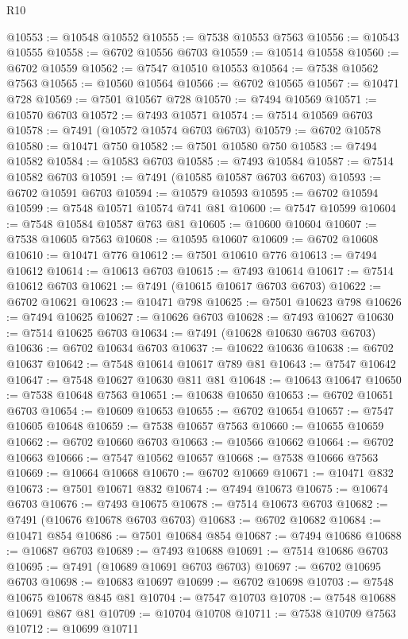 \begin{lexlean}{R10}
\begin{coremodule}
@10553 := @10548 @10552
@10555 := @7538 @10553 @7563
@10556 := @10543 @10555
@10558 := @6702 @10556 @6703
@10559 := @10514 @10558
@10560 := @6702 @10559
@10562 := @7547 @10510 @10553
@10564 := @7538 @10562 @7563
@10565 := @10560 @10564
@10566 := @6702 @10565
@10567 := @10471 @728
@10569 := @7501 @10567 @728
@10570 := @7494 @10569
@10571 := @10570 @6703
@10572 := @7493 @10571
@10574 := @7514 @10569 @6703
@10578 := @7491 (@10572 @10574 @6703 @6703)
@10579 := @6702 @10578
@10580 := @10471 @750
@10582 := @7501 @10580 @750
@10583 := @7494 @10582
@10584 := @10583 @6703
@10585 := @7493 @10584
@10587 := @7514 @10582 @6703
@10591 := @7491 (@10585 @10587 @6703 @6703)
@10593 := @6702 @10591 @6703
@10594 := @10579 @10593
@10595 := @6702 @10594
@10599 := @7548 @10571 @10574 @741 @81
@10600 := @7547 @10599
@10604 := @7548 @10584 @10587 @763 @81
@10605 := @10600 @10604
@10607 := @7538 @10605 @7563
@10608 := @10595 @10607
@10609 := @6702 @10608
@10610 := @10471 @776
@10612 := @7501 @10610 @776
@10613 := @7494 @10612
@10614 := @10613 @6703
@10615 := @7493 @10614
@10617 := @7514 @10612 @6703
@10621 := @7491 (@10615 @10617 @6703 @6703)
@10622 := @6702 @10621
@10623 := @10471 @798
@10625 := @7501 @10623 @798
@10626 := @7494 @10625
@10627 := @10626 @6703
@10628 := @7493 @10627
@10630 := @7514 @10625 @6703
@10634 := @7491 (@10628 @10630 @6703 @6703)
@10636 := @6702 @10634 @6703
@10637 := @10622 @10636
@10638 := @6702 @10637
@10642 := @7548 @10614 @10617 @789 @81
@10643 := @7547 @10642
@10647 := @7548 @10627 @10630 @811 @81
@10648 := @10643 @10647
@10650 := @7538 @10648 @7563
@10651 := @10638 @10650
@10653 := @6702 @10651 @6703
@10654 := @10609 @10653
@10655 := @6702 @10654
@10657 := @7547 @10605 @10648
@10659 := @7538 @10657 @7563
@10660 := @10655 @10659
@10662 := @6702 @10660 @6703
@10663 := @10566 @10662
@10664 := @6702 @10663
@10666 := @7547 @10562 @10657
@10668 := @7538 @10666 @7563
@10669 := @10664 @10668
@10670 := @6702 @10669
@10671 := @10471 @832
@10673 := @7501 @10671 @832
@10674 := @7494 @10673
@10675 := @10674 @6703
@10676 := @7493 @10675
@10678 := @7514 @10673 @6703
@10682 := @7491 (@10676 @10678 @6703 @6703)
@10683 := @6702 @10682
@10684 := @10471 @854
@10686 := @7501 @10684 @854
@10687 := @7494 @10686
@10688 := @10687 @6703
@10689 := @7493 @10688
@10691 := @7514 @10686 @6703
@10695 := @7491 (@10689 @10691 @6703 @6703)
@10697 := @6702 @10695 @6703
@10698 := @10683 @10697
@10699 := @6702 @10698
@10703 := @7548 @10675 @10678 @845 @81
@10704 := @7547 @10703
@10708 := @7548 @10688 @10691 @867 @81
@10709 := @10704 @10708
@10711 := @7538 @10709 @7563
@10712 := @10699 @10711

\end{coremodule}
\end{lexlean}

